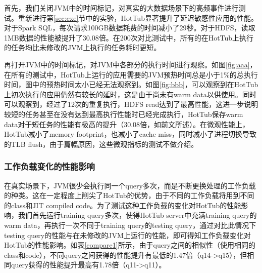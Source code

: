 \documentclass[lang=cn,12pt,a4paper,cite=authoryear]{elegantpaper}
\begin{document}
\begin{figure*}[!htp]
首先，我们关闭JVM中的时间标记，对真实的大数据场景下的高频事件进行测试。重新进行第\ref{sec:exe}节中的实验，HotTub显著提升了延迟敏感性应用的性能。对于Spark SQL，每次请求100GB数据耗费的时间减小了29秒。对于HDFS，读取1MB数据的性能被提升了30.08倍。在200次对比测试中，所有的在HotTub上执行的任务均比未修改的JVM上执行的任务耗时更短。

再打开JVM中的时间标记，对JVM中各部分的执行时间进行观察。如图\ref{fig:aaa}，在所有的测试中，HotTub上运行的应用需要的JVM预热时间总是小于1\%的总执行时间，图中的预热时间太小已经无法观察到。如图\ref{fig:bbb}，可以观察到在HotTub上初次执行的应用仍然有较长的延时，这是由于尚未有warm data以供使用。同时可以观察到，经过了12次的重复执行，HDFS read达到了最高性能，这进一步说明较短的任务甚至在没有达到最高执行性能时已经完成执行，HotTub保存warm data对于短任务的性能有极高的提升（30.08倍，如前文所述）。在微观性能上，HotTub减小了memory footprint，也减小了cache miss，同时减小了进程切换导致的TLB flush，由于篇幅原因，这些微观指标的测试不做介绍。

\subsubsection{工作负载变化的性能影响}
在真实场景下，JVM很少会执行同一个query多次，而是不断更换处理的工作负载的种类。这在一定程度上削尖了HotTub的优势，由于不同的工作负载将用到不同的class和JIT compiled code。为了测试这种工作负载的变化对HotTub的性能影响，我们首先运行training query多次，使得HotTub server中充满training query的warm data，再执行一次不同于training query的testing query，通过对比此情况下testing query的性能与在未修改的JVM上运行的性能，即可得知工作负载变化对HotTub的性能影响。如表\ref{compare1}所示，由于query之间的相似性（使用相同的class和code），不同query之间获得的性能提升有最低的1.47倍（q14->q15），但相同query获得的性能提升最高有1.78倍（q11->q11）。

\begin{table}
  \centering
	\caption{Spark query的不同对HotTub性能优化的影响程度}		
	\label{compare1}
\end{table}    


\end{figure*}
\end{document}
